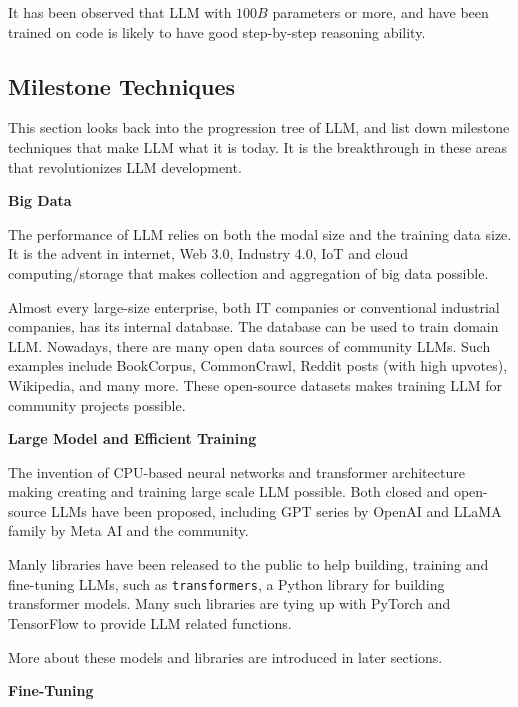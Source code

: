 It has been observed that LLM with $100B$ parameters or more, and have been trained on code is likely to have good step-by-step reasoning ability.

\subsection{Milestone Techniques}

This section looks back into the progression tree of LLM, and list down milestone techniques that make LLM what it is today. It is the breakthrough in these areas that revolutionizes LLM development.

\vspace{0.1in}
\noindent \textbf{Big Data}
\vspace{0.1in}

The performance of LLM relies on both the modal size and the training data size. It is the advent in internet, Web 3.0, Industry 4.0, IoT and cloud computing/storage that makes collection and aggregation of big data possible.

Almost every large-size enterprise, both IT companies or conventional industrial companies, has its internal database. The database can be used to train domain LLM. Nowadays, there are many open data sources of community LLMs. Such examples include BookCorpus, CommonCrawl, Reddit posts (with high upvotes), Wikipedia, and many more. These open-source datasets makes training LLM for community projects possible.

\vspace{0.1in}
\noindent \textbf{Large Model and Efficient Training}
\vspace{0.1in}

The invention of CPU-based neural networks and transformer architecture making creating and training large scale LLM possible. Both closed and open-source LLMs have been proposed, including GPT series by OpenAI and LLaMA family by Meta AI and the community.

Manly libraries have been released to the public to help building, training and fine-tuning LLMs, such as \verb|transformers|, a Python library for building transformer models. Many such libraries are tying up with PyTorch and TensorFlow to provide LLM related functions.

More about these models and libraries are introduced in later sections.

\vspace{0.1in}
\noindent \textbf{Fine-Tuning}
\vspace{0.1in}


